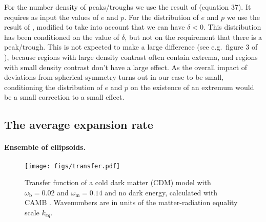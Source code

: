 \documentclass[11pt, a4paper]{article}
\newcommand{\para}{\paragraph}
\renewcommand{\d}{\delta}
\newcommand{\eg}{e.g.\ }
\newcommand{\om}{\omega_{\mathrm{m}}}
\newcommand{\ob}{\omega_{\mathrm{b}}}
\begin{document}
For the number density of peaks/troughs we use the result of \cite{Angrick:2013wba} (equation 37). It requires as input the values of $e$ and $p$. For the distribution of $e$ and $p$ we use the result of \cite{Sheth:1999su}, modified to take into account that we can have $\d<0$. This distribution has been conditioned on the value of $\d$, but not on the requirement that there is a peak/trough. This is not expected to make a large difference (see \eg figure 3 of \cite{Angrick:2013wba}), because regions with large density contrast often contain extrema, and regions with small density contrast don't have a large effect. As the overall impact of deviations from spherical symmetry turns out in our case to be small, conditioning the distribution of $e$ and $p$ on the existence of an extremum would be a small correction to a small effect.

\subsection{The average expansion rate}

\para{Ensemble of ellipsoids.}

\begin{figure}[t]
  \centering
  \texttt{[image: figs/transfer.pdf]}
  \caption{Transfer function of a cold dark matter (CDM) model with
    $\ob=0.02$ and $\om=0.14$ and no dark energy, calculated with CAMB
    \cite{Lewis:1999bs}. Wavenumbers are in units of the
    matter-radiation equality scale $k_{eq}$.}
  \label{fig:Tk}
\end{figure}
\end{document}
